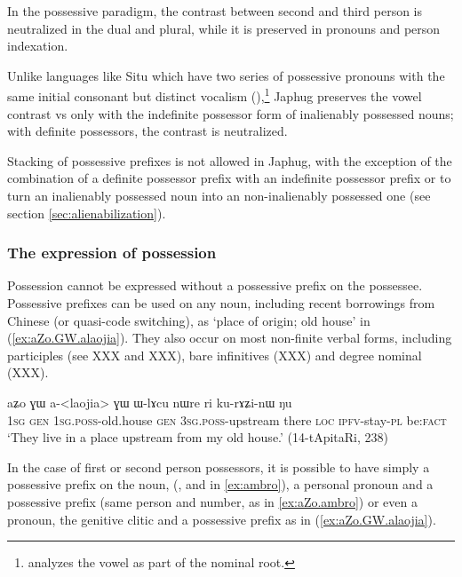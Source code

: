 In the possessive paradigm, the contrast between second and third person is neutralized in the dual and plural, while it is preserved in pronouns and person indexation.

Unlike languages like Situ which have two series of possessive pronouns with the same initial consonant but distinct vocalism (\citealt[168-169]{linxr93jiarongen}),\footnote{\citet[118-119]{prins16kyomkyo} analyzes the vowel as part of the nominal root.} Japhug preserves the vowel contrast  vs  only with the indefinite possessor form of inalienably possessed nouns; with definite possessors, the contrast is neutralized.

Stacking of possessive prefixes is not allowed in Japhug, with the exception of the combination of a definite possessor prefix with an indefinite possessor prefix  or  to turn an inalienably possessed noun into an non-inalienably possessed one (see section \ref{sec:alienabilization}).

\subsubsection{The expression of possession}
Possession cannot be expressed without a possessive prefix on the possessee. Possessive prefixes can be used on any noun, including recent borrowings from Chinese (or quasi-code switching), as   `place of origin; old house' in (\ref{ex:aZo.GW.alaojia}). They also occur on most non-finite verbal forms, including participles (see XXX and XXX), bare infinitives (XXX) and degree nominal (XXX).

\begin{exe}
\ex \label{ex:aZo.GW.alaojia}
\gll
aʑo ɣɯ a-<laojia> ɣɯ ɯ-lɤcu nɯre ri ku-rɤʑi-nɯ ŋu \\
\textsc{1sg} \textsc{gen} \textsc{1sg.poss}-old.house \textsc{gen} \textsc{3sg.poss}-upstream there \textsc{loc} \textsc{ipfv}-stay-\textsc{pl} be:\textsc{fact} \\
\glt `They live in a place upstream from my old house.' (14-tApitaRi, 238)
\end{exe}

In the case of first or second person possessors, it is possible to have simply a possessive prefix on the noun, (,  and  in \ref{ex:ambro}), a personal pronoun and a possessive prefix (same person and number, as in \ref{ex:aZo.ambro}) or even a pronoun, the genitive clitic  and a possessive prefix as in (\ref{ex:aZo.GW.alaojia}).

